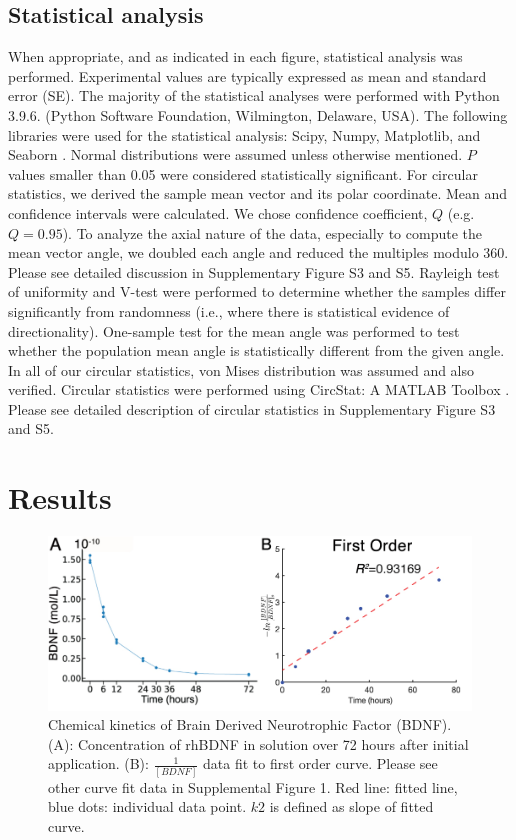 \documentclass[review]{elsarticle}
\begin{document}
\subsection{Statistical analysis}
When appropriate, and as indicated in each figure, statistical analysis was performed. Experimental values are typically expressed as mean and standard error (SE). The majority of the statistical analyses were performed with Python 3.9.6. (Python Software Foundation, Wilmington, Delaware, USA). The following libraries were used for the statistical analysis: Scipy, Numpy, Matplotlib, and Seaborn \cite{5725236, hunter2007,Virtanen2020}. Normal distributions were assumed unless otherwise mentioned. $P$ values smaller than 0.05 were considered statistically significant. For circular statistics, we derived the sample mean vector and its polar coordinate. Mean and confidence intervals were calculated. We chose confidence coefficient, $Q$ (e.g. $Q = 0.95$). To analyze the axial nature of the data, especially to compute the mean vector angle, we doubled each angle and reduced the multiples modulo 360\degree. Please see detailed discussion in Supplementary Figure S3 and S5. Rayleigh test of uniformity and V-test were performed to determine whether the samples differ significantly from randomness (i.e., where there is statistical evidence of directionality). One-sample test for the mean angle was performed to test whether the population mean angle is statistically different from the given angle. In all of our circular statistics, von Mises distribution was assumed and also verified. Circular statistics were performed using CircStat: A MATLAB Toolbox \cite{Berens2009, Berens2009a}. Please see detailed description of circular statistics in Supplementary Figure S3 and S5. 



\section{Results}


\begin{figure}
	\begin{center}
		\includegraphics[width=12.5cm]{Fig_4.jpg}
	\end{center}
	\caption{Chemical kinetics of Brain Derived Neurotrophic Factor (BDNF). (A): Concentration of rhBDNF in solution over 72 hours after initial application. (B): $\frac{1}{[BDNF]}$ data fit to first order curve. Please see other curve fit data in Supplemental Figure 1. Red line: fitted line, blue dots: individual data point. $k2$ is defined as slope of fitted curve.} 
\end{figure}
\end{document}
